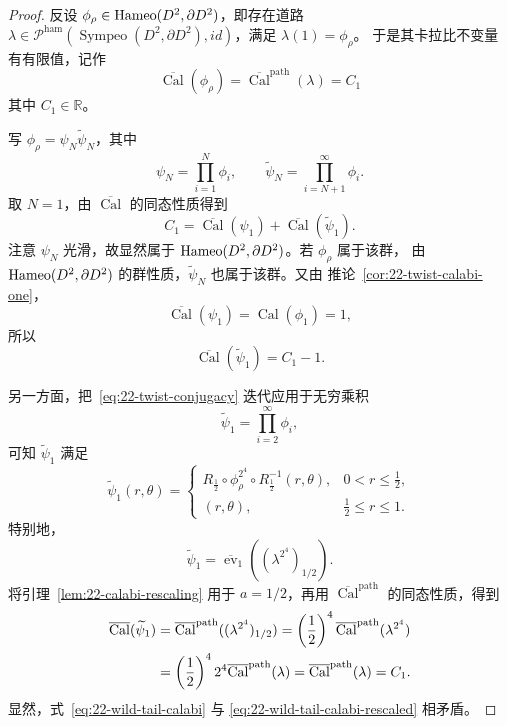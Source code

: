 \begin{proof}
反设 $\phi_\rho\in\operatorname{Hameo}(D^2,\partial D^2)$，即存在道路
$\lambda\in\mathcal P^{\mathrm{ham}}
(\operatorname{Sympeo}(D^2,\partial D^2),id)$，满足 $\lambda(1)=\phi_\rho$。
于是其卡拉比不变量有有限值，记作
\begin{equation}
 \overline{\operatorname{Cal}}(\phi_\rho)
 =\overline{\operatorname{Cal}}^{\mathrm{path}}(\lambda)=C_1
 \label{eq:22-wild-calabi-value}
\end{equation}
其中 $C_1\in\mathbb R$。

写 $\phi_\rho=\psi_N\widetilde\psi_N$，其中
\[
 \psi_N=\prod_{i=1}^N\phi_i,
 \qquad
 \widetilde\psi_N=\prod_{i=N+1}^\infty\phi_i.
\]
取 $N=1$，由 $\overline{\operatorname{Cal}}$ 的同态性质得到
\begin{equation}
 C_1=\overline{\operatorname{Cal}}(\psi_1)
 +\overline{\operatorname{Cal}}(\widetilde\psi_1).
 \label{eq:22-wild-calabi-split}
\end{equation}
注意 $\psi_N$ 光滑，故显然属于 $\operatorname{Hameo}(D^2,\partial D^2)$。若 $\phi_\rho$ 属于该群，
由 $\operatorname{Hameo}(D^2,\partial D^2)$ 的群性质，$\widetilde\psi_N$ 也属于该群。又由
推论~\ref{cor:22-twist-calabi-one}，
\[
 \overline{\operatorname{Cal}}(\psi_1)
 =\operatorname{Cal}(\phi_1)=1,
\]
所以
\begin{equation}
 \overline{\operatorname{Cal}}(\widetilde\psi_1)=C_1-1.
 \label{eq:22-wild-tail-calabi}
\end{equation}

另一方面，把~\eqref{eq:22-twist-conjugacy} 迭代应用于无穷乘积
\[
 \widetilde\psi_1=\prod_{i=2}^\infty\phi_i,
\]
可知 $\widetilde\psi_1$ 满足
\begin{equation}
 \widetilde\psi_1(r,\theta)=
 \begin{cases}
  R_{\frac12}\circ\phi_\rho^{2^4}\circ R_{\frac12}^{-1}(r,\theta),
       &0<r\leq\frac12,\\
  (r,\theta),&\frac12\leq r\leq1.
 \end{cases}
 \label{eq:22-wild-tail-rescaling}
\end{equation}
特别地，
\begin{equation}
 \widetilde\psi_1
 =\overline{\operatorname{ev}}_1((\lambda^{2^4})_{1/2}).
 \label{eq:22-wild-tail-evaluation}
\end{equation}
将引理~\ref{lem:22-calabi-rescaling} 用于 $a=1/2$，再用
$\overline{\operatorname{Cal}}^{\mathrm{path}}$ 的同态性质，得到
\begin{align}
 \overline{\operatorname{Cal}}(\widetilde\psi_1)
 &=\overline{\operatorname{Cal}}^{\mathrm{path}}((\lambda^{2^4})_{1/2})
 =\left(\frac12\right)^4
 \overline{\operatorname{Cal}}^{\mathrm{path}}(\lambda^{2^4})\notag\\
 &=\left(\frac12\right)^4 2^4
 \overline{\operatorname{Cal}}^{\mathrm{path}}(\lambda)
 =\overline{\operatorname{Cal}}^{\mathrm{path}}(\lambda)=C_1.
 \label{eq:22-wild-tail-calabi-rescaled}
\end{align}
显然，式~\eqref{eq:22-wild-tail-calabi} 与
\eqref{eq:22-wild-tail-calabi-rescaled} 相矛盾。
\end{proof}
